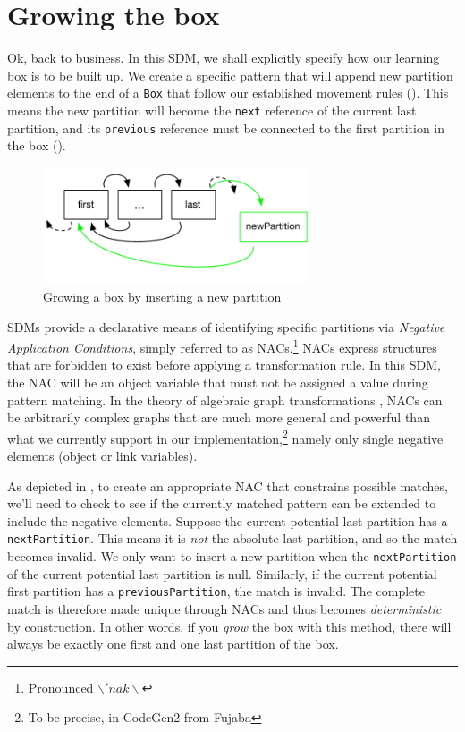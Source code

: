 \newpage
\chapter{Growing the box}
\genHeader

Ok, back to business. In this SDM, we shall explicitly specify how our learning box is to be built up. We create a specific pattern that will append new
partition elements to the end of a \texttt{Box} that follow our established movement rules (). This means the new partition will
become the \texttt{next} reference of the current last partition, and its \texttt{previous} reference must be connected to the first partition in the box
().

\begin{figure}[htbp]
 	\centering
  	\includegraphics[width=0.7\textwidth]{../../org.moflon.doc.handbook.03_storyDiagrams/08_growBox/growBoxNACGoal.pdf}
	\caption{Growing a box by inserting a new partition}
	\label{fig:goal_grow}
\end{figure}
\FloatBarrier

SDMs provide a declarative means of identifying specific partitions via \emph{Negative Application Conditions}, simply referred to as
\mbox{NAC}s.\footnote{Pronounced $\backslash 'nak \backslash$} \mbox{NAC}s express structures that are forbidden to exist before applying a
transformation rule. In this SDM, the \mbox{NAC} will be an object variable that must not be assigned a value during pattern matching. In the theory of
algebraic graph transformations \cite{EEPT06}, \mbox{NACs} can be arbitrarily complex graphs that are much more general and powerful than what we currently
support in our implementation,\footnote{To be precise, in CodeGen2 from Fujaba} namely only single negative elements (object or link variables).

As depicted in , to create an appropriate \mbox{NAC} that constrains possible matches, we'll need to check to see if the currently
matched pattern can be extended to include the negative elements. Suppose the current potential last partition has a \texttt{nextPartition}. This means it
is \emph{not} the absolute last partition, and so the match becomes invalid. We only want to insert a new partition when the \texttt{nextPartition}
of the current potential last partition is null. Similarly, if the current potential first partition has a \texttt{previousPartition}, the match is invalid. The
complete match is therefore made unique through NACs and thus becomes \emph{deterministic} by construction. In other words, if you \emph{grow} the box with this method, there
will always be exactly one first and one last partition of the box.

